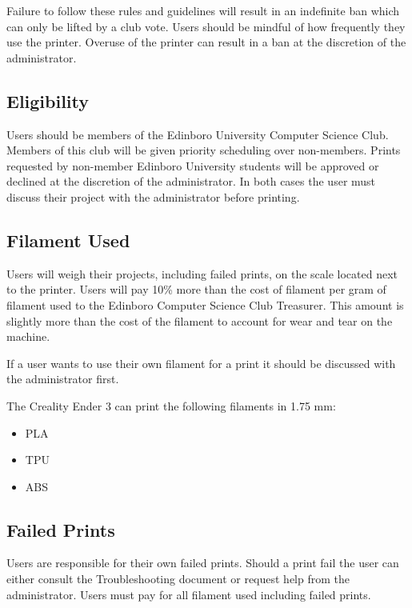 \documentclass{article}
\begin{document}
Failure to follow these rules and guidelines will result in an indefinite ban which can only be lifted by a club vote. Users should be mindful of how frequently they use the printer. Overuse of the printer can result in a ban at the discretion of the administrator. 

\subsection{Eligibility}

Users should be members of the Edinboro University Computer Science Club. Members of this club will be given priority scheduling over non-members. Prints requested by non-member Edinboro University students will be approved or declined at the discretion of the administrator. In both cases the user must discuss their project with the administrator before printing.

\subsection{Filament Used}

Users will weigh their projects, including failed prints, on the scale located next to the printer. Users will pay 10\% more than the cost of filament per gram of filament used to the Edinboro Computer Science Club Treasurer. This amount is slightly more than the cost of the filament to account for wear and tear on the machine.

If a user wants to use their own filament for a print it should be discussed with the administrator first.

The Creality Ender 3 can print the following filaments in 1.75 mm:

\begin{itemize}
	\item PLA
	\item TPU
	\item ABS
\end{itemize}

\subsection{Failed Prints}

Users are responsible for their own failed prints. Should a print fail the user can either consult the Troubleshooting document or request help from the
administrator. Users must pay for all filament used including failed prints.
\end{document}
